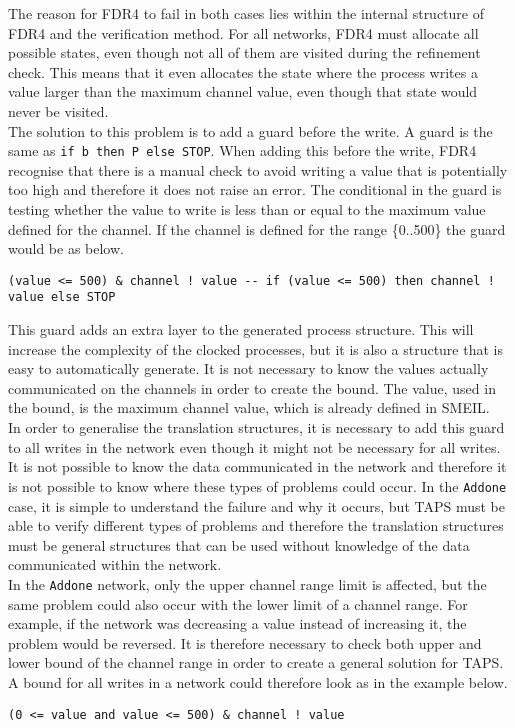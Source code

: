 The reason for FDR4 to fail in both cases lies within the internal structure of FDR4 and the verification method. For all networks, FDR4 must allocate all possible states, even though not all of them are visited during the refinement check. This means that it even allocates the state where the process writes a value larger than the maximum channel value, even though that state would never be visited.\\

The solution to this problem is to add a guard before the write. A \cspm{} guard is the same as \texttt{if b then P else STOP}. When adding this before the write, FDR4 recognise that there is a manual check to avoid writing a value that is potentially too high and therefore it does not raise an error. The conditional in the guard is testing whether the value to write is less than or equal to the maximum value defined for the channel. If the channel is defined for the range \{0..500\} the guard would be as below.
\begin{verbatim}
(value <= 500) & channel ! value -- if (value <= 500) then channel ! value else STOP
\end{verbatim}

This guard adds an extra layer to the generated process structure. This will increase the complexity of the clocked processes, but it is also a structure that is easy to automatically generate. It is not necessary to know the values actually communicated on the channels in order to create the bound. The value, used in the bound, is the maximum channel value, which is already defined in SMEIL. \\

In order to generalise the translation structures, it is necessary to add this guard to all writes in the network even though it might not be necessary for all writes. It is not possible to know the data communicated in the network and therefore it is not possible to know where these types of problems could occur. In the \texttt{Addone} case, it is simple to understand the failure and why it occurs, but TAPS must be able to verify different types of problems and therefore the translation structures must be general structures that can be used without knowledge of the data communicated within the network. \\

In the \texttt{Addone} network, only the upper channel range limit is affected, but the same problem could also occur with the lower limit of a channel range. For example, if the network was decreasing a value instead of increasing it, the problem would be reversed. It is therefore necessary to check both upper and lower bound of the channel range in order to create a general solution for TAPS. A bound for all writes in a network could therefore look as in the example below.
\begin{verbatim}
(0 <= value and value <= 500) & channel ! value
\end{verbatim}
